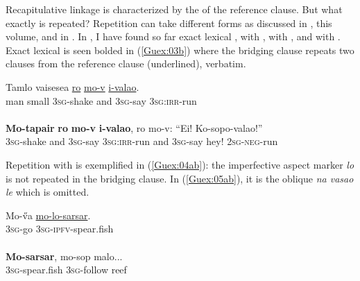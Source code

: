 \documentclass[output=paper]{LSP/langsci}
\begin{document}
Recapitulative linkage is characterized by the  of the reference clause. But what exactly is repeated? Repetition can take different forms as discussed in \citeauthor{guerin18}, this volume, and in \citet[][224]{brown.2000}. In , I have found so far exact lexical ,  with , with , and  with .  Exact lexical  is seen bolded in (\ref{Guex:03b}) where the bridging clause repeats two clauses from the reference clause (underlined), verbatim. 

\begin{exe}
\ex \label{Guex:03ab}
\begin{xlist}
\ex \label{Guex:03a}
\gll Tamlo   vaisesea   \underline{}   \underline{ro}    \underline{mo-v}       \underline{i-valao}.\\
man     small      \textsc{3sg}-shake    and   \textsc{3sg}-say   \textsc{3sg}:\textsc{irr}-run\\
\glt {}\\
\ex \label{Guex:03b}
\gll \textbf{Mo-tapair}   \textbf{ro}     \textbf{mo-v}       \textbf{i-valao}, ro mo-v:     ``Ei!  Ko-sopo-valao!''\\     	       
    \textsc{3sg}-shake    and   \textsc{3sg}-say   \textsc{3sg:irr}-run    and \textsc{3sg}-say   hey!  \textsc{2sg-neg}-run\\
\glt {} 
\end{xlist}
\end{exe}

Repetition with  is exemplified in (\ref{Guex:04ab}): the imperfective aspect marker \textit{lo} is not repeated in the bridging clause. In (\ref{Guex:05ab}), it is the oblique \textit{na vasao le} which is omitted.

\begin{exe}
\ex \label{Guex:04ab}
\begin{xlist}
\ex \label{Guex:04a}
\gll Mo-\H{v}a \underline{mo-lo-sarsar}.\\
\textsc{3sg}-go     \textsc{3sg}-\textsc{ipfv}-spear.fish\\
\glt {}\\
\ex \label{Guex:04b}
\gll \textbf{Mo-sarsar},   mo-sop         malo...\\     	       
    \textsc{3sg}-spear.fish    \textsc{3sg}-follow   reef \\
\glt {} 
\end{xlist}
\end{exe}
\end{document}
